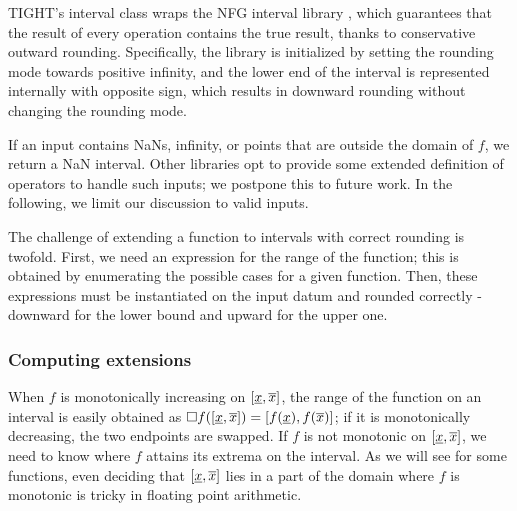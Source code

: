 TIGHT's interval class wraps the NFG interval library \cite{nfg}, which guarantees that the result of every operation contains the true result, thanks to conservative outward rounding. Specifically, the library is initialized by setting the rounding mode towards positive infinity, and the lower end of the interval is represented internally with opposite sign, which results in downward rounding without changing the rounding mode.

If an input contains NaNs, infinity, or points that are outside the domain of $f$, we return a NaN interval.
Other libraries opt to provide some extended definition of operators to handle such inputs; we postpone this to future work.
In the following, we limit our discussion to valid inputs.

The challenge of extending a function to intervals with correct rounding is twofold.
First, we need an expression for the range of the function; this is obtained by enumerating the possible cases for a given function.
Then, these expressions must be instantiated on the input datum and rounded correctly - downward for the lower bound and upward for the upper one.

\subsubsection{Computing extensions}
When $f$ is monotonically increasing on $[\underline{x}, \overline{x}]$, the range of the function on an interval is easily obtained as $\Box f([\underline{x}, \overline{x}]) = [f(\underline{x}), f(\overline{x})]$; if it is monotonically decreasing, the two endpoints are swapped.
If $f$ is not monotonic on $[\underline{x}, \overline{x}]$, we need to know where $f$ attains its extrema on the interval. As we will see for some functions, even deciding that $[\underline{x}, \overline{x}]$ lies in a part of the domain where $f$ is monotonic is tricky in floating point arithmetic.

